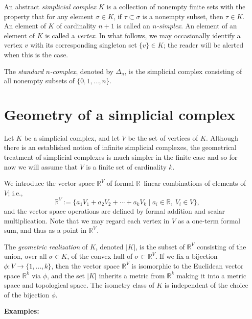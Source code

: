 \documentclass[12pt]{article}
\newcommand{\R}{\mathbb{R}}
\begin{document}
An abstract \emph{simplicial complex} $K$ is a collection of nonempty
finite sets with the property that for any element $\sigma \in K$, if
$\tau \subset \sigma$ is a nonempty subset, then $\tau \in K$. An
element of $K$ of cardinality $n+1$ is called an \emph{
$n$-simplex}. An element of an element of $K$ is called a \emph{vertex}. In what follows, we may occasionally identify a vertex $v$ with its corresponding singleton set $\{v\} \in K$; the reader
will be alerted when this is the case.

The \emph{standard $n$-complex}, denoted by $\Delta_n$, is the
simplicial complex consisting of all nonempty subsets of
$\{0,1,\ldots,n\}$.

\section{Geometry of a simplicial complex}
Let $K$ be a simplicial complex, and let $V$ be the set of vertices of
$K$. Although there is an established notion of infinite simplicial
complexes, the geometrical treatment of simplicial complexes is much simpler in the finite case and so for
now we will assume that $V$ is a finite set of cardinality $k$.

We introduce the vector space $\mathbb{R}^V$ of formal
$\R$--linear combinations of elements of $V$; i.e.,
$$
\R^V := \{a_1 V_1 + a_2 V_2 + \cdots + a_k V_k \mid a_i \in \R,\ V_i \in
V\},
$$
and the vector space operations are defined by formal addition and
scalar multiplication. Note that we may regard each vertex in $V$ as a
one-term formal sum, and thus as a point in $\R^V$.

The \emph{geometric realization} of $K$, denoted $|K|$, is the subset
of $\mathbb{R}^V$ consisting of the union, over all $\sigma \in K$, of
the convex hull of $\sigma \subset \mathbb{R}^V$. If we fix a bijection $\phi\colon V \to \{1, \ldots, k\}$, then the vector space $\mathbb{R}^V$ is isomorphic to the Euclidean vector space $\mathbb{R}^k$ via $\phi$, and the set $|K|$
inherits a metric from $\mathbb{R}^k$ making it into a metric space
and topological space. The isometry class of $K$ is independent of the choice of the bijection $\phi$.

\textbf{Examples:}
\end{document}
